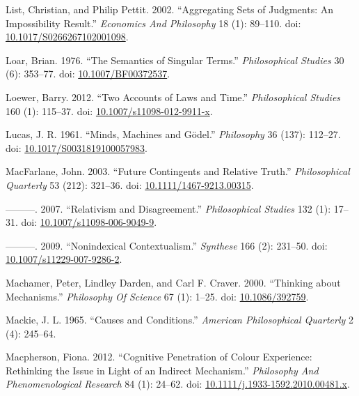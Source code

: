 \documentclass[
  10pt,
  letterpaper,
  DIV=11,
  numbers=noendperiod,
  twoside]{scrartcl}
\newlength{\cslhangindent}
\newenvironment{CSLReferences}[2] %
 {\begin{list}{}{%
  \setlength{\itemindent}{0pt}
  \setlength{\leftmargin}{0pt}
  \setlength{\parsep}{0pt}
  \ifodd #1
   \setlength{\leftmargin}{\cslhangindent}
   \setlength{\itemindent}{-1\cslhangindent}
  \fi
  \setlength{\itemsep}{#2\baselineskip}}}
 {\end{list}}
\begin{document}
\begin{CSLReferences}{1}{0}
List, Christian, and Philip Pettit. 2002. {``Aggregating Sets of
Judgments: An Impossibility Result.''} \emph{Economics And Philosophy}
18 (1): 89--110. doi:
\href{https://doi.org/10.1017/S0266267102001098}{10.1017/S0266267102001098}.

Loar, Brian. 1976. {``The Semantics of Singular Terms.''}
\emph{Philosophical Studies} 30 (6): 353--77. doi:
\href{https://doi.org/10.1007/BF00372537}{10.1007/BF00372537}.

Loewer, Barry. 2012. {``Two Accounts of Laws and Time.''}
\emph{Philosophical Studies} 160 (1): 115--37. doi:
\href{https://doi.org/10.1007/s11098-012-9911-x}{10.1007/s11098-012-9911-x}.

Lucas, J. R. 1961. {``Minds, Machines and Gödel.''} \emph{Philosophy} 36
(137): 112--27. doi:
\href{https://doi.org/10.1017/S0031819100057983}{10.1017/S0031819100057983}.

MacFarlane, John. 2003. {``Future Contingents and Relative Truth.''}
\emph{Philosophical Quarterly} 53 (212): 321--36. doi:
\href{https://doi.org/10.1111/1467-9213.00315}{10.1111/1467-9213.00315}.

---------. 2007. {``Relativism and Disagreement.''} \emph{Philosophical
Studies} 132 (1): 17--31. doi:
\href{https://doi.org/10.1007/s11098-006-9049-9}{10.1007/s11098-006-9049-9}.

---------. 2009. {``Nonindexical Contextualism.''} \emph{Synthese} 166
(2): 231--50. doi:
\href{https://doi.org/10.1007/s11229-007-9286-2}{10.1007/s11229-007-9286-2}.

Machamer, Peter, Lindley Darden, and Carl F. Craver. 2000. {``Thinking
about Mechanisms.''} \emph{Philosophy Of Science} 67 (1): 1--25. doi:
\href{https://doi.org/10.1086/392759}{10.1086/392759}.

Mackie, J. L. 1965. {``Causes and Conditions.''} \emph{American
Philosophical Quarterly} 2 (4): 245--64.

Macpherson, Fiona. 2012. {``Cognitive Penetration of Colour Experience:
Rethinking the Issue in Light of an Indirect Mechanism.''}
\emph{Philosophy And Phenomenological Research} 84 (1): 24--62. doi:
\href{https://doi.org/10.1111/j.1933-1592.2010.00481.x}{10.1111/j.1933-1592.2010.00481.x}.


\end{CSLReferences}
\end{document}
